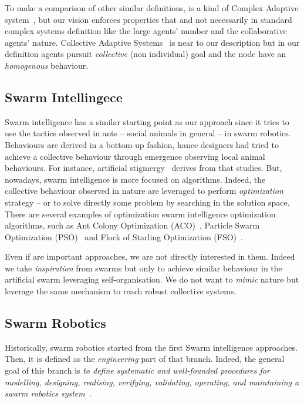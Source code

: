 \documentclass[11pt]{article}
\begin{document}
To make a comparison of other similar definitions, \cpsw{} is a kind of Complex Adaptive system~\cite{holland1992complex}, but our vision enforces properties that and not necessarily in standard complex systems definition like the large agents' number and the collaborative agents' nature.
Collective Adaptive Systems~\cite{DBLP:journals/corr/abs-1108-5643} is near to our \cpsw{} description but in our definition agents pursuit \emph{collective} (non individual) goal and the node have an \emph{homogenous} behaviour.
\subsection{Swarm Intellingece}
Swarm intelligence has a similar starting point as our approach since it tries to use the tactics observed in ants -- social animals in general -- in swarm robotics. Behaviours are derived in a bottom-up fashion, hance designers had tried to achieve a collective behaviour through emergence observing local animal behaviours.
%
For instance, artificial stigmergy~\cite{DBLP:journals/fgcs/DorigoBT00} derives from that studies. But, nowadays, swarm intelligence is more focused on algorithms. 
Indeed, the collective behaviour observed in nature are leveraged to perform \textit{optimization} strategy -- or to solve directly some problem by searching in the solution space.
There are several examples of optimization swarm intelligence optimization algorithms,  such as Ant Colony Optimization (ACO)~\cite{DBLP:journals/tsmc/DorigoMC96}, Particle Swarm Optimization (PSO)~\cite{DBLP:conf/icnn/KennedyE95} and Flock of Starling Optimization (FSO)~\cite{DBLP:series/sci/FulgineiS11}.

Even if are important approaches, we are not directly interested in them. Indeed we take \textit{inspiration} from swarms but only to achieve similar behaviour in the artificial swarm leveraging self-organisation. We do not want to \textit{mimic} nature but leverage the same mechanism to reach robust collective systems.
\subsection{Swarm Robotics}
Historically, swarm robotics started from the first Swarm intelligence approaches. Then, it is defined as the \textit{engineering} part of that branch. Indeed, the general goal of this branch is \emph{to define systematic and well-founded procedures for modelling, designing, realising, verifying, validating, operating, and maintaining a swarm robotics system}~\cite{DBLP:journals/swarm/BrambillaFBD13}.
\end{document}
